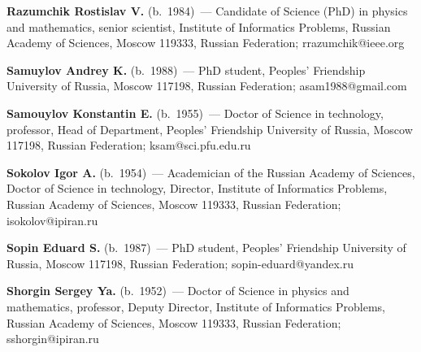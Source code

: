 \noindent \textbf{Razumchik Rostislav V.} (b.\ 1984)~--- Candidate of Science 
(PhD) in physics and mathematics, senior scientist, Institute of Informatics 
Problems, Russian Academy of Sciences, Moscow 119333, Russian Federation; rrazumchik@ieee.org

\vspace*{3pt}


\noindent \textbf{Samuylov Andrey K.} (b.\ 1988)~--- PhD student, Peoples' 
Friendship University of Russia, Moscow 117198, Russian Federation; asam1988@gmail.com

\vspace*{3pt}

\noindent \textbf{Samouylov Konstantin E.} (b.\ 1955)~--- Doctor of Science in 
technology, professor, Head of Department, Peoples' Friendship University of 
Russia, Moscow 117198, Russian Federation; ksam@sci.pfu.edu.ru


\vspace*{3pt}
\noindent
\textbf{Sokolov Igor A.} (b.\ 1954)~--- Academician of the Russian Academy of Sciences, 
Doctor of Science in technology, Director, Institute of Informatics Problems, 
Russian Academy of Sciences, Moscow 119333, Russian Federation; isokolov@ipiran.ru 

\vspace*{3pt}
\noindent \textbf{Sopin Eduard S.} (b.\ 1987)~--- PhD student, Peoples' 
Friendship University of Russia, Moscow 117198, Russian Federation; sopin-eduard@yandex.ru

\vspace*{3pt}
\noindent \textbf{Shorgin Sergey Ya.} (b.\ 1952)~--- Doctor of Science in 
physics and mathematics, professor, Deputy Director, Institute of Informatics 
Problems, Russian Academy of Sciences, Moscow 119333, Russian Federation; sshorgin@ipiran.ru

 \label{end\stat}

\renewcommand{\bibname}{\protect\rm Литература}